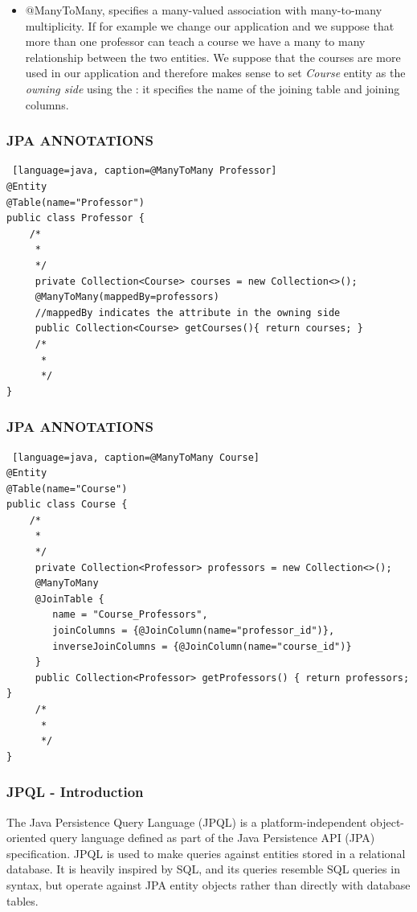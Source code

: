 \documentclass{beamer}
\begin{document}
\begin{frame} [fragile]
\begin{itemize}
\frametitle{JPA ANNOTATIONS}
\item @ManyToMany, specifies a many-valued association with many-to-many multiplicity.  If for example we change our application and we suppose that more than one professor can teach a course we have a many to many relationship between the two entities. We suppose that the courses are more used in our application and therefore makes sense to set \textit{Course} entity as the \textit{owning side} using the : it specifies the name of the joining table and joining columns.
\end{itemize}
\end{frame}

\begin{frame} [fragile]
\frametitle{JPA ANNOTATIONS}
\begin{lstlisting} [language=java, caption=@ManyToMany Professor]
@Entity
@Table(name="Professor")
public class Professor {
	/*
	 *
	 */
	 private Collection<Course> courses = new Collection<>();
	 @ManyToMany(mappedBy=professors)
	 //mappedBy indicates the attribute in the owning side
	 public Collection<Course> getCourses(){ return courses; }
	 /*
	  *
	  */
}
\end{lstlisting}
\end{frame}

\begin{frame} [fragile]
\frametitle{JPA ANNOTATIONS}
\begin{lstlisting} [language=java, caption=@ManyToMany Course]
@Entity
@Table(name="Course")
public class Course {
	/*
	 *
	 */
	 private Collection<Professor> professors = new Collection<>();
	 @ManyToMany
	 @JoinTable {
	 	name = "Course_Professors",
	 	joinColumns = {@JoinColumn(name="professor_id")},
	 	inverseJoinColumns = {@JoinColumn(name="course_id")}
	 }
	 public Collection<Professor> getProfessors() { return professors; }
	 /*
	  *
	  */
}
\end{lstlisting}
\end{frame}

\begin{frame}
	\frametitle{JPQL - Introduction}
	The Java Persistence Query Language (JPQL) is a platform-independent object-oriented query language defined as part of the Java Persistence API (JPA) specification.
	\linebreak
	\linebreak
	JPQL is used to make queries against entities stored in a relational database. It is heavily inspired by SQL, and its queries resemble SQL queries in syntax, but operate against JPA entity objects rather than directly with database tables.
\end{frame}
\end{document}
